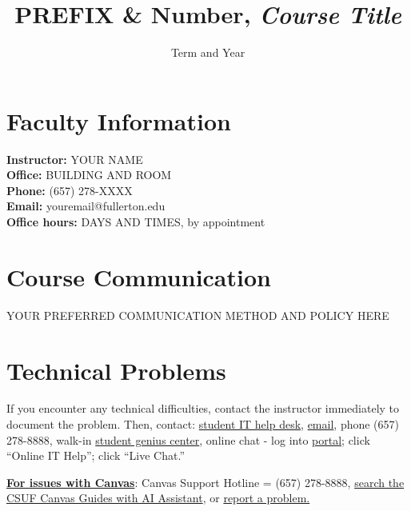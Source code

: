 \documentclass[12pt]{article}     %
\title{PREFIX \& Number, \textit{Course Title}} %
\author{}                         %
\date{Term and Year}              %
\begin{document}

\maketitle

\section*{Faculty Information}
\noindent \textbf{Instructor:} YOUR NAME \\
\noindent \textbf{Office:} BUILDING AND ROOM \\
\noindent \textbf{Phone:} (657) 278-XXXX \\
\noindent \textbf{Email:} youremail@fullerton.edu \\
\noindent \textbf{Office hours:} DAYS AND TIMES, by appointment

\section*{Course Communication}
YOUR PREFERRED COMMUNICATION METHOD AND POLICY HERE

\section*{Technical Problems}
If you encounter any technical difficulties, contact the instructor immediately to document the problem. Then, contact: \href{http://www.fullerton.edu/it/students/helpdesk/index.php}{student IT help desk}, \href{mailto:StudentITHelpDesk@fullerton.edu}{email}, phone (657) 278-8888, walk-in \href{http://www.fullerton.edu/it/students/sgc/index.php}{student genius center}, online chat - log into \href{http://my.fullerton.edu}{portal}; click ``Online IT Help''; click ``Live Chat.''

\vspace{0.5em}
\noindent \textbf{\underline{For issues with Canvas}}: Canvas Support Hotline = (657) 278-8888, \href{https://canvashelp.fullerton.edu/}{search the CSUF Canvas Guides with AI Assistant}, or \href{https://titans.service-now.com/sp?id=sc_cat_item&sys_id=f88efe80ebea6a10fb7cfcffcad0cdc6&subject=Canvas}{report a problem.}
\end{document}
